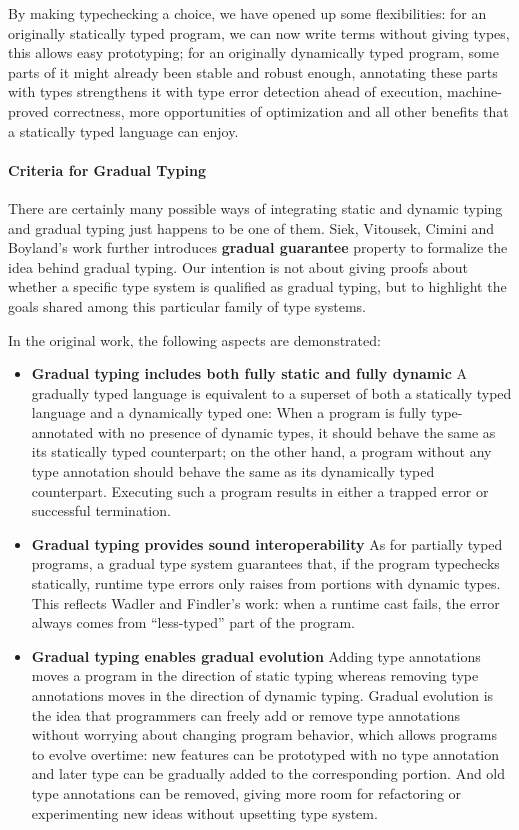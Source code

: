 By making typechecking a choice, we have opened up some flexibilities:
for an originally statically typed program, we can now write terms without giving types,
this allows easy prototyping; for an originally dynamically typed program,
some parts of it might already been stable and robust enough, annotating these parts
with types strengthens it with type error detection ahead of execution, machine-proved correctness,
more opportunities of optimization and 
all other benefits that a statically typed language can enjoy.

\paragraph{Criteria for Gradual Typing}

There are certainly many possible ways of integrating static and dynamic typing
and gradual typing just happens to be one of them.
Siek, Vitousek, Cimini and Boyland's work \cite{siek2015refined}
further introduces \textbf{gradual guarantee} property
to formalize the idea behind gradual typing.
Our intention is not about giving proofs about whether a specific type system is qualified as
gradual typing, but to highlight the goals shared among this particular family of type systems.

In the original work, the following aspects are demonstrated:

\begin{itemize}
	\item \textbf{Gradual typing includes both fully static and fully dynamic}
	A gradually typed language is equivalent to a superset of both a statically typed
	language and a dynamically typed one:
	When a program is fully type-annotated with no presence of dynamic types,
	it should behave the same as its statically typed counterpart;
	on the other hand, a program without any type annotation should behave the same
	as its dynamically typed counterpart. Executing such a program
	results in either a trapped error \cite{luca1997} or successful termination.
	\item \textbf{Gradual typing provides sound interoperability}
	As for partially typed programs, a gradual type system guarantees that,
	if the program typechecks statically, runtime type errors only raises from
	portions with dynamic types.
	This reflects Wadler and Findler's work\cite{wadler2009well}:
	when a runtime cast fails, the error
	always comes from ``less-typed'' part of the program.
	\item \textbf{Gradual typing enables gradual evolution}
	Adding type annotations moves a program in the direction of static typing
	whereas removing type annotations moves in the direction of dynamic typing.
	Gradual evolution is the idea that programmers can freely add or remove type annotations
	without worrying about changing program behavior, which allows programs to evolve overtime:
	new features can be prototyped with no type annotation and later type can be gradually
	added to the corresponding portion. And old type annotations can be removed,
	giving more room for refactoring or experimenting new ideas without upsetting type system.
\end{itemize}

